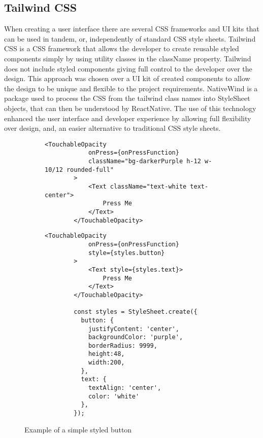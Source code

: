 \subsection{Tailwind CSS}
When creating a user interface there are several CSS frameworks and UI kits that can be used in tandem, or, independently of standard CSS style sheets. Tailwind CSS \cite{tailwind} is a CSS framework that allows the developer to create reusable styled components simply by using utility classes in the className property. Tailwind does not include styled components giving full control to the developer over the design. This approach was chosen over a UI kit of created components to allow the design to be unique and flexible to the project requirements. NativeWind \cite{nativewind} is a package used to process the CSS from the tailwind class names into StyleSheet objects, that can then be understood by ReactNative. The use of this technology enhanced the user interface and developer experience by allowing full flexibility over design, and, an easier alternative to traditional CSS style sheets. 
\begin{figure}[!htbp]
    \begin{subfigure}[b]{0.49\textwidth}
        \begin{lstlisting}[language=jsJsx, caption={Styled using Tailwind CSS}]
        <TouchableOpacity
            onPress={onPressFunction}
            className="bg-darkerPurple h-12 w-10/12 rounded-full"
        >
            <Text className="text-white text-center">
                Press Me
            </Text>
        </TouchableOpacity>
        \end{lstlisting}
    \end{subfigure}
    \hspace{2em}
    \begin{subfigure}[b]{0.49\textwidth}
        \begin{lstlisting}[language=jsJsx, caption={Styled using a traditional StyleSheet}]
        <TouchableOpacity
            onPress={onPressFunction}
            style={styles.button}
        >
            <Text style={styles.text}>
                Press Me
            </Text>
        </TouchableOpacity>
            
        const styles = StyleSheet.create({
          button: {
            justifyContent: 'center',
            backgroundColor: 'purple',
            borderRadius: 9999,
            height:48,
            width:200,
          },
          text: {
            textAlign: 'center',
            color: 'white'
          },
        });
        \end{lstlisting}
    \end{subfigure}
    \caption{Example of a simple styled button}
    \label{fig:tailwind}
\end{figure}
\FloatBarrier
